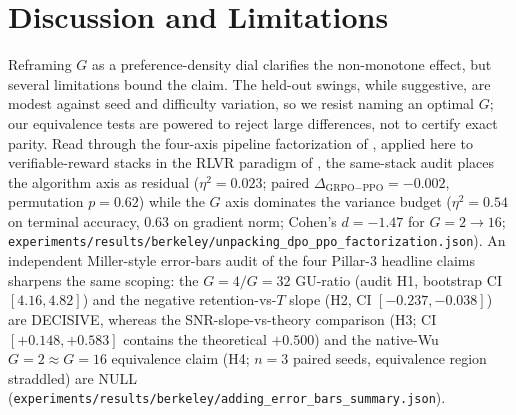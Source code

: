 \section{Discussion and Limitations}
\label{sec:p3-discussion}
Reframing $G$ as a preference-density dial clarifies the non-monotone effect, but
several limitations bound the claim. The held-out swings, while suggestive, are
modest against seed and difficulty variation, so we resist naming an optimal $G$;
our equivalence tests are powered to reject large differences, not to certify exact
parity. Read through the four-axis pipeline factorization of
\citet{ivison2024unpacking}, applied here to verifiable-reward stacks in the
RLVR paradigm of \citet{lambert2024tulu3}, the same-stack audit places the
algorithm axis as residual ($\eta^2{=}0.023$; paired
$\Delta_{\text{GRPO}-\text{PPO}}{=}-0.002$, permutation $p{=}0.62$) while the
$G$ axis dominates the variance budget ($\eta^2{=}0.54$ on terminal accuracy,
$0.63$ on gradient norm; Cohen's $d{=}-1.47$ for $G{=}2{\to}16$;
\texttt{experiments/results/berkeley/unpacking\_dpo\_ppo\_factorization.json}).
An independent Miller-style error-bars audit \citep{miller2024erroreval} of the
four Pillar-3 headline claims sharpens the same scoping: the
$G{=}4/G{=}32$ GU-ratio (audit H1, bootstrap CI $[4.16, 4.82]$) and the
negative retention-vs-$T$ slope (H2, CI $[-0.237, -0.038]$) are DECISIVE,
whereas the SNR-slope-vs-theory comparison (H3; CI $[+0.148, +0.583]$
contains the theoretical $+0.500$) and the native-Wu $G{=}2 \approx G{=}16$
equivalence claim (H4; $n{=}3$ paired seeds, equivalence region straddled)
are NULL
(\texttt{experiments/results/berkeley/adding\_error\_bars\_summary.json}).

